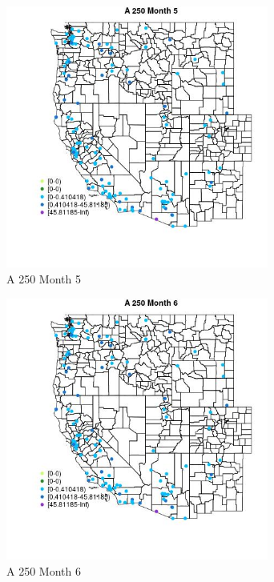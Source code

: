 \begin{figure} 
\centering  
\includegraphics[width=0.77\textwidth]{Code_Outputs/Report_ML_input_PM25_Step4_part_e_de_duplicated_aves_MapObsMo5A_250.jpg} 
\caption{\label{fig:Report_ML_input_PM25_Step4_part_e_de_duplicated_avesMapObsMo5A_250}A 250 Month 5} 
\end{figure} 
 

\begin{figure} 
\centering  
\includegraphics[width=0.77\textwidth]{Code_Outputs/Report_ML_input_PM25_Step4_part_e_de_duplicated_aves_MapObsMo6A_250.jpg} 
\caption{\label{fig:Report_ML_input_PM25_Step4_part_e_de_duplicated_avesMapObsMo6A_250}A 250 Month 6} 
\end{figure} 
 

